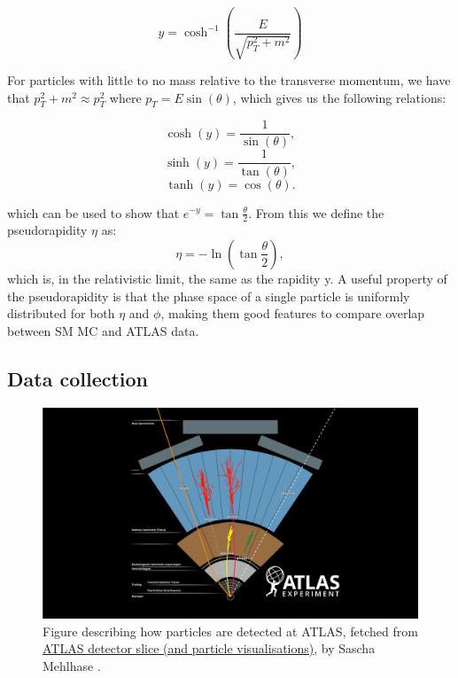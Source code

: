 \begin{equation}
    y = \cosh^{-1}\left( \frac{E}{\sqrt{p_T^2 + m^2}}\right)
\end{equation}

For particles with little to no mass relative to the transverse momentum, we have that $p_T^2 + m^2 \approx p_T^2$ 
where $p_T = E\sin{(\theta)}$, which gives us the following relations:

\begin{equation*}
    \cosh(y) = \frac{1}{\sin(\theta)},
\end{equation*}
\begin{equation*}
    \sinh(y) = \frac{1}{\tan(\theta)},
\end{equation*}
\begin{equation*}
    \tanh(y) = \cos(\theta).
\end{equation*}

which can be used to show that $e^{-y} = \tan{\frac{\theta}{2}}$. From this we define the pseudorapidity $\eta$ as:
\begin{equation}
    \eta = -\ln{\left( \tan{\frac{\theta}{2}}\right)},
\end{equation}
which is, in the relativistic limit, the same as the rapidity y. A useful property of the pseudorapidity is that 
the phase space of a single particle is uniformly distributed for both $\eta$ and $\phi$, making them good features 
to compare overlap between SM MC and ATLAS data\cite{Gramstad:1631043}. 
\subsection*{Data collection}

\begin{figure}[h!]
    \includegraphics[width=\linewidth]{Figures/atlas/ATLAS Detector Schematic black particles.png}
    \caption[Detector tracking of particles]{Figure describing how particles are detected at ATLAS, fetched from \href{https://cds.cern.ch/record/2770815}{	ATLAS detector slice (and particle visualisations)}, by Sascha Mehlhase \cite{Mehlhase:2770815} . }
    \label{fig:atlas_particle_detect}
\end{figure}

